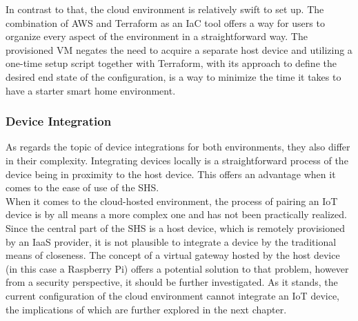 In contrast to that, the cloud environment is relatively swift to set up. The combination of AWS and Terraform as an IaC tool offers a way for users to organize every aspect of the environment in a straightforward way. The provisioned VM negates the need to acquire a separate host device and utilizing a one-time setup script together with Terraform, with its approach to define the desired end state of the configuration, is a way to minimize the time it takes to have a starter smart home environment.

\subsubsection{Device Integration}
As regards the topic of device integrations for both environments, they also differ in their complexity.
Integrating devices locally is a straightforward process of the device being in proximity to the host device. This offers an advantage when it comes to the ease of use of the SHS.\\

When it comes to the cloud-hosted environment, the process of pairing an IoT device is by all means a more complex one and has not been practically realized. Since the central part of the SHS is a host device, which is remotely provisioned by an IaaS provider, it is not plausible to integrate a device by the traditional means of closeness. The concept of a virtual gateway hosted by the host device (in this case a Raspberry Pi) offers a potential solution to that problem, however from a security perspective, it should be further investigated. As it stands, the current configuration of the cloud environment cannot integrate an IoT device, the implications of which are further explored in the next chapter. 